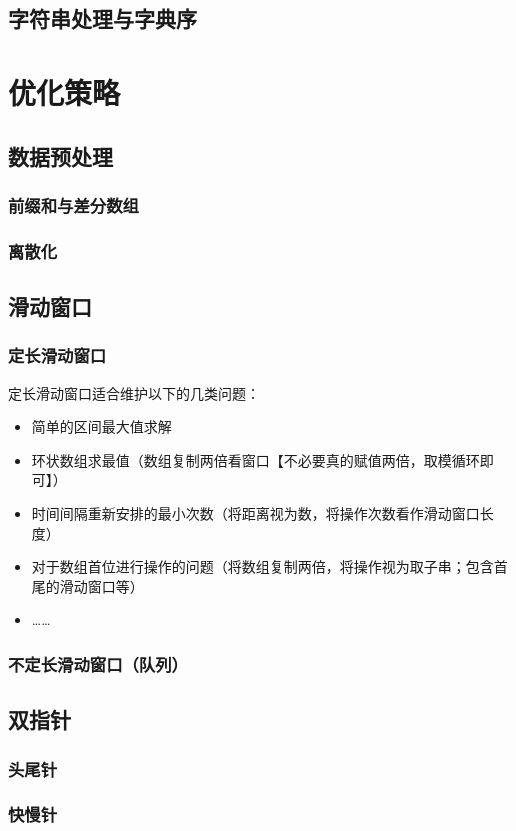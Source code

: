 \documentclass[12pt,a4paper,UTF16]{ctexbook}
\theoremstyle{plain}
\begin{document}
\section{字符串处理与字典序}

\chapter{优化策略}
\section{数据预处理}
\subsection{前缀和与差分数组}
\subsection{离散化}
\section{滑动窗口}
\subsection{定长滑动窗口}
定长滑动窗口适合维护以下的几类问题：
\begin{itemize}
\item 简单的区间最大值求解
\item 环状数组求最值（数组复制两倍看窗口【不必要真的赋值两倍，取模循环即可】）
\item 时间间隔重新安排的最小次数（将距离视为数，将操作次数看作滑动窗口长度）
\item 对于数组首位进行操作的问题（将数组复制两倍，将操作视为取子串；包含首尾的滑动窗口等）
\item ……
\end{itemize}
\subsection{不定长滑动窗口（队列）}
\section{双指针}
\subsection{头尾针}
\subsection{快慢针}
\end{document}
